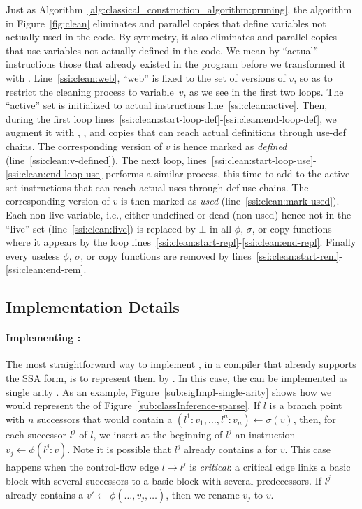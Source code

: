 {Just as Algorithm~\ref{alg:classical_construction_algorithm:pruning}, the algorithm in Figure~\ref{fig:clean} eliminates \phifuns and parallel copies that define variables not actually used in the code. By symmetry, it also eliminates \sigmafuns  and parallel copies  that use variables not actually defined in the code.
We mean by ``actual'' instructions those that already existed in the program before we transformed it with \ssiSplit.
Line~\ref{ssi:clean:web}, ``web'' is fixed to the set of versions of $v$, so as to restrict the cleaning process to variable~$v$, as we see in the first two loops.
The ``active'' set is initialized to actual instructions line~\ref{ssi:clean:active}.
Then, during the first loop lines~\ref{ssi:clean:start-loop-def}-\ref{ssi:clean:end-loop-def}, we augment it with \phifuns, \sigmafuns, and copies that can reach actual definitions through use-def chains.
The corresponding version of $v$ is hence marked as \emph{defined} (line~\ref{ssi:clean:v-defined}).
The next loop, lines~\ref{ssi:clean:start-loop-use}-\ref{ssi:clean:end-loop-use} performs a similar process, this time to add to the active set instructions that can reach actual uses through def-use chains.
The corresponding version of $v$ is then marked as \emph{used} (line~\ref{ssi:clean:mark-used}).
Each non live variable, i.e., either undefined or dead (non used) hence not in the ``live'' set (line~\ref{ssi:clean:live}) is replaced by $\bot$ in all $\phi$, $\sigma$, or copy functions where it appears by the loop lines~\ref{ssi:clean:start-repl}-\ref{ssi:clean:end-repl}.
Finally every useless $\phi$, $\sigma$, or copy functions are removed by lines~\ref{ssi:clean:start-rem}-\ref{ssi:clean:end-rem}.
\subsection{Implementation Details}
\label{sub:special}

\paragraph{Implementing \sigmafuns: }
The most straightforward way to implement \sigmafuns,\index{\sigmafun} in a compiler that already supports the SSA form, is to represent them by \phifuns.
In this case, the \sigmafuns can be implemented as single arity \phifuns.
As an example, Figure~\ref{sub:sigImpl-single-arity} shows how we would represent the \sigmafuns of Figure~\ref{sub:classInference-sparse}.
If $l$ is a branch point with $n$ successors that would contain a \sigmafun $(l^1:v_1, \ldots, l^n:v_n) \gets \sigma(v)$, then, for each successor $l^j$ of $l$, we insert at the beginning of $l^j$ an instruction $v_j \gets \phi(l^j:v)$.
Note it is possible that $l^j$ already contains a \phifun for $v$.
This case happens when the control-flow edge $l \rightarrow l^j$ is {\em critical}:
a critical edge links a basic block with several successors to a basic block with several predecessors.
If $l^j$ already contains a \phifun $v' \gets \phi(\ldots, v_j, \ldots)$, then we rename $v_j$ to $v$.

}
